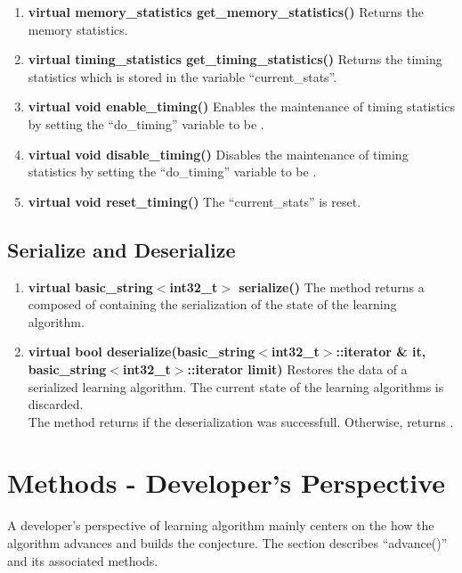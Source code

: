 \begin{enumerate}
 \item \textbf{virtual memory\_statistics get\_memory\_statistics()} \vskip 1pt
	Returns the memory statistics.

 \item \textbf{virtual timing\_statistics get\_timing\_statistics()} \vskip 1pt
	Returns the timing statistics which is stored in the variable ``current\_stats''.

 \item \textbf{virtual void enable\_timing()} \vskip 1pt
	Enables the maintenance of timing statistics by setting the ``do\_timing'' variable to be \true.

 \item \textbf{virtual void disable\_timing()} \vskip 1pt
	Disables the maintenance of timing statistics by setting the ``do\_timing'' variable to be \false.

 \item \textbf{virtual void reset\_timing()} \vskip 1pt
	The ``current\_stats'' is reset.
\end{enumerate}



\subsection*{Serialize and Deserialize}

\begin{enumerate}
 \item \textbf{virtual basic\_string$<$int32\_t$>$ serialize()} \vskip 1pt
	The method returns a \stringtype composed of \integer containing the serialization of the state of the learning algorithm.

 \item \textbf{virtual bool deserialize(basic\_string$<$int32\_t$>$::iterator \& it, basic\_string$<$int32\_t$>$::iterator limit)} \vskip 1pt
	Restores the data of a serialized learning algorithm. The current state of the learning algorithms is discarded. \\
	The method returns \true if the deserialization was successfull. Otherwise, returns \false.
\end{enumerate}


\section{Methods - Developer's Perspective}

A developer's perspective of learning algorithm mainly centers on the how the algorithm advances and builds the conjecture. The section describes ``advance()'' and its associated methods.

